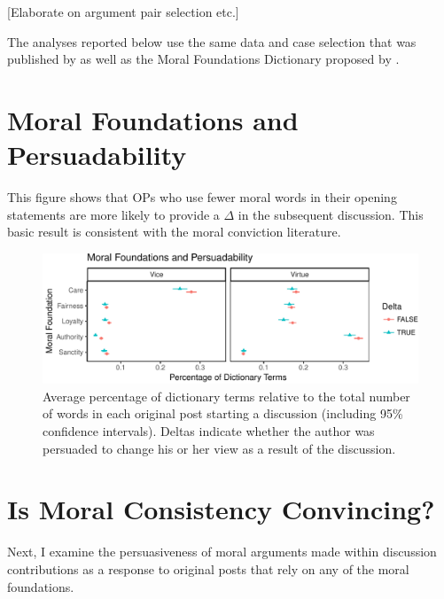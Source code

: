 \documentclass[12pt,]{article}
\begin{document}
{[}Elaborate on argument pair selection etc.{]}

The analyses reported below use the same data and case selection that
was published by \citet{tan2016winning} as well as the Moral Foundations
Dictionary proposed by \citet{graham2009liberals}.

\section{Moral Foundations and
Persuadability}\label{moral-foundations-and-persuadability}

This figure shows that OPs who use fewer moral words in their opening
statements are more likely to provide a \(\Delta\) in the subsequent
discussion. This basic result is consistent with the moral conviction
literature.

\begin{figure}
\centering
\includegraphics{prelim_files/figure-latex/examine op data-1.pdf}
\caption{Average percentage of dictionary terms relative to the total
number of words in each original post starting a discussion (including
95\% confidence intervals). Deltas indicate whether the author was
persuaded to change his or her view as a result of the discussion.}
\end{figure}

\section{Is Moral Consistency
Convincing?}\label{is-moral-consistency-convincing}

Next, I examine the persuasiveness of moral arguments made within
discussion contributions as a response to original posts that rely on
any of the moral foundations.
\end{document}
